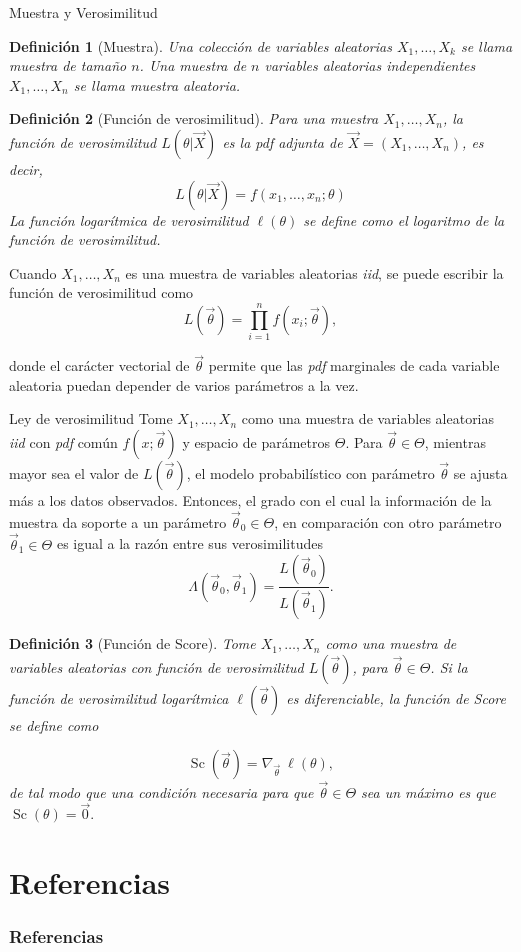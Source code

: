\documentclass{beamer}
\newtheorem{defi}{Definición}[section]
\begin{document}
	\begin{frame}[allowframebreaks]{Muestra y Verosimilitud}
	\begin{defi}[Muestra]
			Una colección de variables aleatorias $X_1,\dots,X_k$ se llama muestra de tamaño $n$. Una muestra de $n$ variables aleatorias independientes $X_1,\dots,X_n$ se llama muestra aleatoria.
		\end{defi}
		
		\begin{defi}[Función de verosimilitud]
			Para una muestra $X_1,\dots,X_n$, la función de verosimilitud $L(\theta|\vec{X})$ es la pdf adjunta de $\vec{X}=(X_1,\dots,X_n)$, es decir,
$$L(\theta|\vec{X})=f(x_1,\dots,x_n;\theta)$$			
			La función logarítmica de verosimilitud $\ell(\theta)$ se define como el logaritmo de la función de verosimilitud.
		\end{defi}
		
		Cuando $X_1,\dots,X_n$ es una muestra de variables aleatorias \textit{iid}, se puede escribir la función de verosimilitud como
		$$L(\vec{\theta})=\prod_{i=1}^n f(x_i;\vec{\theta}),$$
		
		donde el carácter vectorial de $\vec{\theta}$ permite que las \textit{pdf} marginales de cada variable aleatoria puedan depender de varios parámetros a la vez.
		\end{frame}
		\begin{frame}[allowframebreaks]
		
		\begin{block}{Ley de verosimilitud}
		Tome $X_1,\dots,X_n$ como una muestra de variables aleatorias \textit{iid} con \textit{pdf} común $f(x;\vec{\theta})$ y espacio de parámetros $\Theta$. Para $\vec{\theta}\in\Theta$, mientras mayor sea el valor de $L(\vec{\theta})$, el modelo probabilístico con parámetro $\vec{\theta}$ se ajusta más a los datos observados. Entonces, el grado con el cual la información de la muestra da soporte a un parámetro $\vec{\theta}_0\in\Theta$, en comparación con otro parámetro $\vec{\theta}_1\in\Theta$ es igual a la razón entre sus verosimilitudes
		$$\Lambda(\vec{\theta}_0,\vec{\theta}_1)=\frac{L(\vec{\theta}_0)}{L(\vec{\theta}_1)}.$$
		\end{block}
		
		\begin{defi}[Función de Score]
			Tome $X_1,\dots,X_n$ como una muestra de variables aleatorias con función de verosimilitud $L(\vec{\theta})$, para $\vec{\theta}\in\Theta$. Si la función de verosimilitud logarítmica $\ell(\vec{\theta})$ es diferenciable, la función de Score se define como
			
			$$\mathop{Sc}(\vec{\theta})=\nabla_{\vec{\theta}}\ \ell(\theta),$$
			de tal modo que una condición necesaria para que $\vec{\theta}\in\Theta$ sea un máximo es que $\mathop{Sc}(\theta)=\vec{0}.$
		\end{defi}
	\end{frame}
	\section{Referencias}
	\begin{frame}
	\frametitle{Referencias}

	\nocite{*}
	
	

	\end{frame}
	
\end{document}
